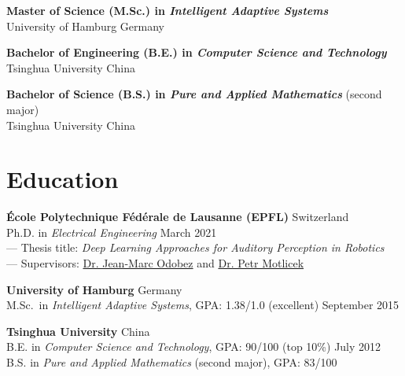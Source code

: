 \documentclass[a4paper,9pt]{extarticle} %
\newcommand{\ind}{\hspace*{1em}}
\begin{document}
\parbox{\textwidth}{%
\textbf{Master of Science (M.Sc.) in \textit{Intelligent Adaptive Systems}} \\
\ind{} University of Hamburg \hfill Germany
}

\parbox{\textwidth}{%
\textbf{Bachelor of Engineering (B.E.) in \textit{Computer Science and Technology}} \\
\ind{} Tsinghua University \hfill China
}

\parbox{\textwidth}{%
\textbf{Bachelor of Science (B.S.) in \textit{Pure and Applied Mathematics}} (second major) \\
\ind{} Tsinghua University \hfill China
}

\iffalse{}


\section{Education}
\parbox{\textwidth}{%
\textbf{\'Ecole Polytechnique F\'ed\'erale de Lausanne (EPFL)} \hfill Switzerland \\
\ind{} Ph.D. in \textit{Electrical Engineering} \hfill March 2021 \\
\ind{} --- Thesis title: \textit{Deep Learning Approaches for Auditory Perception in Robotics} \\
\ind{} --- Supervisors: \href{https://idiap.ch/~odobez}{Dr. Jean-Marc Odobez} and \href{https://people.idiap.ch/pmotlic}{Dr. Petr Motlicek}
}

\parbox{\textwidth}{%
\textbf{University of Hamburg} \hfill Germany \\
\ind{} M.Sc.\ in \textit{Intelligent Adaptive Systems}, GPA\@: 1.38/1.0 (excellent)  \hfill September 2015%
}

\parbox{\textwidth}{%
\textbf{Tsinghua University} \hfill China \\
\ind{} B.E. in \textit{Computer Science and Technology}, GPA\@: 90/100 (top 10\%) \hfill July 2012 \\
\ind{} B.S. in \textit{Pure and Applied Mathematics} (second major), GPA\@: 83/100 %
}

\end{document}

